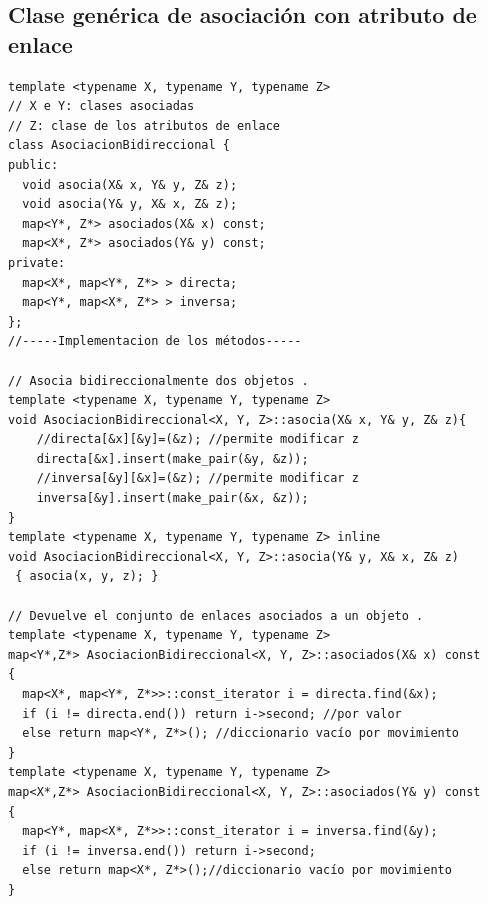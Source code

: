 \subsection{Clase genérica de asociación con atributo de enlace}
\begin{lstlisting}[frame=single]
template <typename X, typename Y, typename Z> 
// X e Y: clases asociadas
// Z: clase de los atributos de enlace
class AsociacionBidireccional {
public:
  void asocia(X& x, Y& y, Z& z);
  void asocia(Y& y, X& x, Z& z);
  map<Y*, Z*> asociados(X& x) const;
  map<X*, Z*> asociados(Y& y) const;
private:
  map<X*, map<Y*, Z*> > directa;
  map<Y*, map<X*, Z*> > inversa;
};
//-----Implementacion de los métodos-----

// Asocia bidireccionalmente dos objetos .
template <typename X, typename Y, typename Z>
void AsociacionBidireccional<X, Y, Z>::asocia(X& x, Y& y, Z& z){
	//directa[&x][&y]=(&z); //permite modificar z
	directa[&x].insert(make_pair(&y, &z));
	//inversa[&y][&x]=(&z); //permite modificar z
	inversa[&y].insert(make_pair(&x, &z));
}
template <typename X, typename Y, typename Z> inline
void AsociacionBidireccional<X, Y, Z>::asocia(Y& y, X& x, Z& z)
 { asocia(x, y, z); }
 
// Devuelve el conjunto de enlaces asociados a un objeto .
template <typename X, typename Y, typename Z>
map<Y*,Z*> AsociacionBidireccional<X, Y, Z>::asociados(X& x) const
{
  map<X*, map<Y*, Z*>>::const_iterator i = directa.find(&x);
  if (i != directa.end()) return i->second; //por valor
  else return map<Y*, Z*>(); //diccionario vacío por movimiento
}
template <typename X, typename Y, typename Z>
map<X*,Z*> AsociacionBidireccional<X, Y, Z>::asociados(Y& y) const
{
  map<Y*, map<X*, Z*>>::const_iterator i = inversa.find(&y);
  if (i != inversa.end()) return i->second;
  else return map<X*, Z*>();//diccionario vacío por movimiento
}
\end{lstlisting}